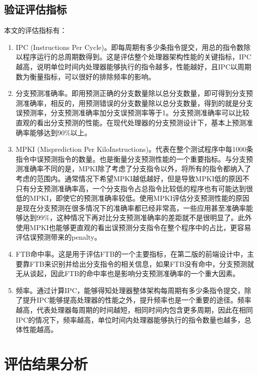 \subsection{验证评估指标}

本文的评估指标有：

\begin{enumerate}
	\item IPC (Instructions Per Cycle)。即每周期有多少条指令提交，用总的指令数除以程序运行的总周期数得到。这是评估整个处理器架构性能的关键指标，IPC越高，说明单位时间内处理器能够执行的指令越多，性能越好，且IPC以周期数为衡量指标，可以很好的排除频率的影响。
	\item 分支预测准确率。即用预测正确的分支数量除以总分支数量，即可得到分支预测准确率，相反的，用预测错误的分支数量除以总分支数量，得到的就是分支误预测率，分支预测准确率加分支误预测率等于1。分支预测准确率可以比较直观的看出分支预测的性能。在现代处理器的分支预测设计下，基本上预测准确率能够达到90\%以上。
	\item MPKI (Misprediction Per KiloInstructions)。代表在整个测试程序中每1000条指令中误预测指令的数量。也是衡量分支预测性能的一个重要指标。与分支预测准确率不同的是，MPKI除了考虑了分支指令以外，将所有的指令都纳入了考虑的范围内。通常情况下希望MPKI越低越好，但是导致MPKI低的原因不只有分支预测准确率高，一个分支指令占总指令比较低的程序也有可能达到很低的MPKI，即使它的预测准确率较低。使用MPKI评估分支预测性能的原因是现在分支预测在很多情况下的准确率都已经非常高，一些应用甚至准确率能够达到99\%，这种情况下再对比分支预测准确率的差距就不是很明显了。此外使用MPKI也能够更直观的看出误预测分支指令在整个程序中的占比，更容易评估误预测带来的penalty。
	\item FTB命中率。这是用于评估FTB的一个主要指标，在第二版的前端设计中，主要靠FTB来识别并给出分支指令的相关信息，如果FTB没有命中，分支预测就无从谈起，因此FTB的命中率也是影响分支预测准确率的一个重大因素。
	\item 频率。通过计算IPC，能够得知处理器整体架构每周期有多少条指令提交，除了提升IPC能够提高处理器的性能之外，提升频率也是一个重要的途径。频率越高，代表处理器每周期的时间越短，相同时间内包含更多周期，因此在相同IPC的情况下，频率越高，单位时间内处理器能够执行的指令数量也越多，总体性能越高。
\end{enumerate}

\section{评估结果分析}

